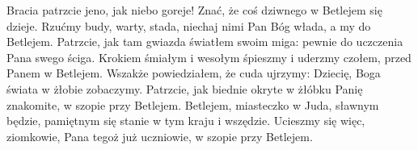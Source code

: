 \beginverse
Bracia patrzcie jeno,
jak niebo goreje!
Znać, że coś dziwnego
w Betlejem się dzieje.
Rzućmy budy, warty, stada,
niechaj nimi Pan Bóg włada,
a my do Betlejem.
\endverse
\beginverse
Patrzcie, jak tam gwiazda
światłem swoim miga:
pewnie do uczczenia
Pana swego ściga.
Krokiem śmiałym i wesołym
śpieszmy i uderzmy czołem,
przed Panem w Betlejem.
\endverse
\beginverse
Wszakże powiedziałem,
że cuda ujrzymy:
Dziecię, Boga świata
w żłobie zobaczymy.
Patrzcie, jak biednie okryte
w żłóbku Panię znakomite,
w szopie przy Betlejem.
\endverse
\beginverse
Betlejem, miasteczko
w Juda, sławnym będzie,
pamiętnym się stanie
w tym kraju i wszędzie.
Ucieszmy się więc, ziomkowie,
Pana tegoż już uczniowie,
w szopie przy Betlejem.
\endverse
\endsong